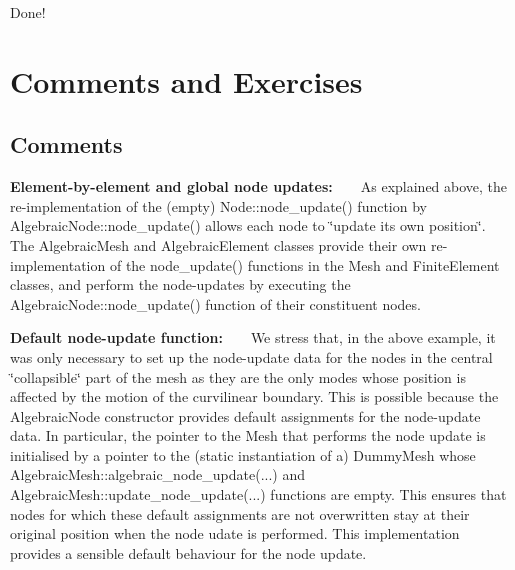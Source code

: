 Done!



 

\hypertarget{index_comments}{}\section{Comments and Exercises}\label{index_comments}
\hypertarget{index_comm}{}\subsection{Comments}\label{index_comm}

\begin{DoxyItemize}
\item {\bfseries Element-\/by-\/element and global node updates\+:} ~\newline
 ~\newline
 As explained above, the re-\/implementation of the (empty) {\ttfamily Node\+::node\+\_\+update()} function by {\ttfamily Algebraic\+Node\+::node\+\_\+update()} allows each node to \char`\"{}update its 
  own position\char`\"{}. The {\ttfamily Algebraic\+Mesh} and {\ttfamily Algebraic\+Element} classes provide their own re-\/implementation of the {\ttfamily node\+\_\+update()} functions in the {\ttfamily Mesh} and {\ttfamily Finite\+Element} classes, and perform the node-\/updates by executing the {\ttfamily Algebraic\+Node\+::node\+\_\+update()} function of their constituent nodes. ~\newline
~\newline

\item {\bfseries Default node-\/update function\+:} ~\newline
 ~\newline
 We stress that, in the above example, it was only necessary to set up the node-\/update data for the nodes in the central \char`\"{}collapsible\char`\"{} part of the mesh as they are the only modes whose position is affected by the motion of the curvilinear boundary. This is possible because the {\ttfamily Algebraic\+Node} constructor provides default assignments for the node-\/update data. In particular, the pointer to the Mesh that performs the node update is initialised by a pointer to the (static instantiation of a) {\ttfamily Dummy\+Mesh} whose {\ttfamily Algebraic\+Mesh\+::algebraic\+\_\+node\+\_\+update}(...) and {\ttfamily Algebraic\+Mesh\+::update\+\_\+node\+\_\+update}(...) functions are empty. This ensures that nodes for which these default assignments are not overwritten stay at their original position when the node udate is performed. This implementation provides a sensible default behaviour for the node update. ~\newline
~\newline


\end{DoxyItemize}

